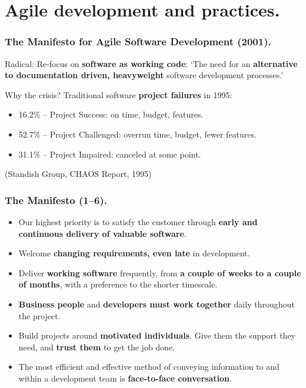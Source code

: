 \documentclass{beamer} %
\newcommand\emc[1]{\textcolor{brightblue}{\textbf{#1}}}
\begin{document}
\section{Agile development and practices.}

\begin{frame}
\frametitle{The Manifesto for Agile Software Development (2001).}

Radical: Re-focus on \emc{software as working code}: `The need for an \emc{alternative to documentation driven, heavyweight} software development processes.'

\vspace{5mm}
Why the crisis? Traditional software \emc{project failures} in 1995:
\begin{itemize}
  \item 16.2\% -- Project Success: on time, budget, features.
  \item 52.7\% -- Project Challenged: overrun time, budget, fewer features.
  \item 31.1\% -- Project Impaired: canceled at some point.
\end{itemize}
 (Standish Group, CHAOS Report, 1995)

\end{frame}

\begin{frame}
\frametitle{The Manifesto (1--6).}


\begin{itemize}
\item Our highest priority is to satisfy the customer
through \emc{early and continuous delivery
of valuable software}.

\item Welcome \emc{changing requirements, even late} in 
development. 

\item Deliver \emc{working software} frequently, from \emc{a 
couple of weeks to a couple of months}, with a 
preference to the shorter timescale.

\item \emc{Business people} and \emc{developers must work 
together} daily throughout the project.

\item Build projects around \emc{motivated individuals}. 
Give them the support they need, 
and \emc{trust them} to get the job done.

\item The most efficient and effective method of 
conveying information to and within a development 
team is \emc{face-to-face conversation}.

\end{itemize}

\end{frame}
\end{document}
